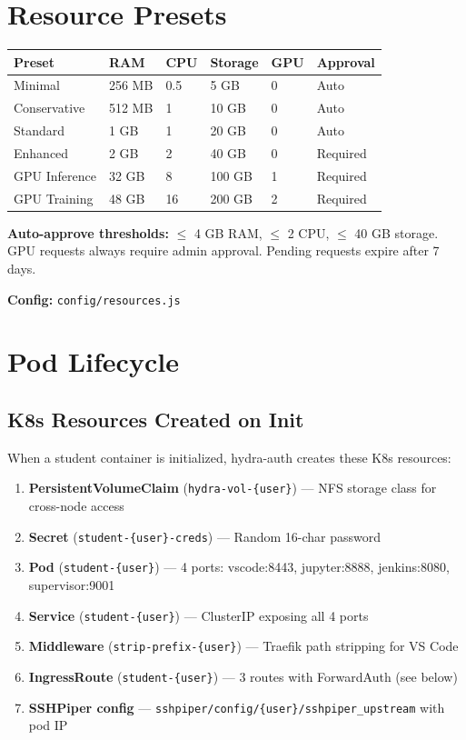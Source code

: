 \documentclass[11pt,a4paper]{article}
\begin{document}
\section{Resource Presets}

\begin{table}[H]
\centering
\begin{tabular}{llllll}
\toprule
\textbf{Preset} & \textbf{RAM} & \textbf{CPU} & \textbf{Storage} & \textbf{GPU} & \textbf{Approval} \\
\midrule
Minimal & 256 MB & 0.5 & 5 GB & 0 & Auto \\
Conservative & 512 MB & 1 & 10 GB & 0 & Auto \\
Standard & 1 GB & 1 & 20 GB & 0 & Auto \\
Enhanced & 2 GB & 2 & 40 GB & 0 & Required \\
GPU Inference & 32 GB & 8 & 100 GB & 1 & Required \\
GPU Training & 48 GB & 16 & 200 GB & 2 & Required \\
\bottomrule
\end{tabular}
\end{table}

\textbf{Auto-approve thresholds:} $\leq$ 4 GB RAM, $\leq$ 2 CPU, $\leq$ 40 GB storage. GPU requests always require admin approval. Pending requests expire after 7 days.

\textbf{Config:} \texttt{config/resources.js}

\section{Pod Lifecycle}

\subsection{K8s Resources Created on Init}

When a student container is initialized, hydra-auth creates these K8s resources:

\begin{enumerate}[nosep]
    \item \textbf{PersistentVolumeClaim} (\texttt{hydra-vol-\{user\}}) --- NFS storage class for cross-node access
    \item \textbf{Secret} (\texttt{student-\{user\}-creds}) --- Random 16-char password
    \item \textbf{Pod} (\texttt{student-\{user\}}) --- 4 ports: vscode:8443, jupyter:8888, jenkins:8080, supervisor:9001
    \item \textbf{Service} (\texttt{student-\{user\}}) --- ClusterIP exposing all 4 ports
    \item \textbf{Middleware} (\texttt{strip-prefix-\{user\}}) --- Traefik path stripping for VS Code
    \item \textbf{IngressRoute} (\texttt{student-\{user\}}) --- 3 routes with ForwardAuth (see below)
    \item \textbf{SSHPiper config} --- \texttt{sshpiper/config/\{user\}/sshpiper\_upstream} with pod IP
\end{enumerate}
\end{document}
